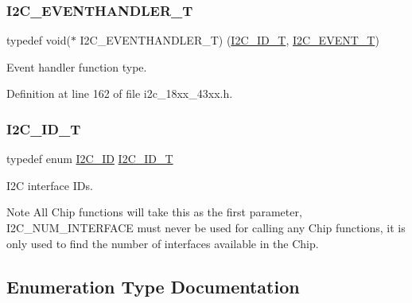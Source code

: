 \subsubsection{\texorpdfstring{I2\+C\+\_\+\+E\+V\+E\+N\+T\+H\+A\+N\+D\+L\+E\+R\+\_\+T}{I2C\_EVENTHANDLER\_T}}
{\footnotesize\ttfamily typedef void($\ast$ I2\+C\+\_\+\+E\+V\+E\+N\+T\+H\+A\+N\+D\+L\+E\+R\+\_\+T) (\hyperlink{group___i2_c__18_x_x__43_x_x_ga957556a4d900506cd4cba8427afd81e6}{I2\+C\+\_\+\+I\+D\+\_\+T}, \hyperlink{group___i2_c__18_x_x__43_x_x_gacb2cd4e03ea48339d327e4f387441bf3}{I2\+C\+\_\+\+E\+V\+E\+N\+T\+\_\+T})}



Event handler function type. 



Definition at line 162 of file i2c\+\_\+18xx\+\_\+43xx.\+h.

\mbox{\label{group___i2_c__18_x_x__43_x_x_ga957556a4d900506cd4cba8427afd81e6}} 
\subsubsection{\texorpdfstring{I2\+C\+\_\+\+I\+D\+\_\+T}{I2C\_ID\_T}}
{\footnotesize\ttfamily typedef enum \hyperlink{group___i2_c__18_x_x__43_x_x_gaec46000c6a1fe2c12c9a0c7ee3677626}{I2\+C\+\_\+\+ID}  \hyperlink{group___i2_c__18_x_x__43_x_x_ga957556a4d900506cd4cba8427afd81e6}{I2\+C\+\_\+\+I\+D\+\_\+T}}



I2C interface I\+Ds. 

\begin{DoxyNote}{Note}
All Chip functions will take this as the first parameter, I2\+C\+\_\+\+N\+U\+M\+\_\+\+I\+N\+T\+E\+R\+F\+A\+CE must never be used for calling any Chip functions, it is only used to find the number of interfaces available in the Chip. 
\end{DoxyNote}


\subsection{Enumeration Type Documentation}
\mbox{\label{group___i2_c__18_x_x__43_x_x_gacb2cd4e03ea48339d327e4f387441bf3}} 
